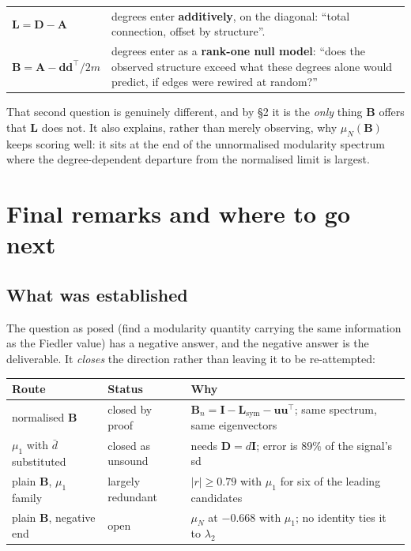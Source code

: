 \documentclass[11pt,a4paper]{article}
\newcommand{\Lap}{\mathbf{L}}
\newcommand{\Amat}{\mathbf{A}}
\newcommand{\Bmat}{\mathbf{B}}
\newcommand{\Dmat}{\mathbf{D}}
\newcommand{\dvec}{\mathbf{d}}
\newcommand{\Lsym}{\Lap_{\mathrm{sym}}}
\newcommand{\Bn}{\Bmat_{n}}
\begin{document}
\begin{center}\small
\renewcommand{\arraystretch}{1.25}
\begin{tabular}{@{}>{\raggedright\arraybackslash}p{4.2cm}
                  >{\raggedright\arraybackslash}p{11.2cm}@{}}
\toprule
$\Lap = \Dmat - \Amat$ &
degrees enter \textbf{additively}, on the diagonal: ``total connection, offset by
structure''. \\
$\Bmat = \Amat - \dvec\dvec^{\!\top}\!/2m$ &
degrees enter as a \textbf{rank-one null model}: ``does the observed structure
exceed what these degrees alone would predict, if edges were rewired at random?''
\\
\bottomrule
\end{tabular}
\end{center}

That second question is genuinely different, and by \S2 it is the \emph{only} thing
$\Bmat$ offers that $\Lap$ does not. It also explains, rather than merely
observing, why $\mu_N(\Bmat)$ keeps scoring well: it sits at the end of the
unnormalised modularity spectrum where the degree-dependent departure from the
normalised limit is largest.

\section{Final remarks and where to go next}

\subsection*{What was established}

The question as posed (find a modularity quantity carrying the same information
as the Fiedler value) has a negative answer, and the negative answer is the
deliverable. It \emph{closes} the direction rather than leaving it to be
re-attempted:

\begin{center}\small
\renewcommand{\arraystretch}{1.2}
\begin{tabular}{@{}lll@{}}
\toprule
\textbf{Route} & \textbf{Status} & \textbf{Why} \\
\midrule
normalised $\Bmat$ & \textcolor{BadRed}{closed by proof} &
$\Bn = \mathbf{I}-\Lsym-\mathbf{u}\mathbf{u}^{\!\top}$; same spectrum, same eigenvectors \\
$\mu_1$ with $\bar d$ substituted & \textcolor{BadRed}{closed as unsound} &
needs $\Dmat=d\mathbf{I}$; error is $89\%$ of the signal's sd \\
plain $\Bmat$, $\mu_1$ family & \textcolor{BadRed}{largely redundant} &
$|r|\ge0.79$ with $\mu_1$ for six of the leading candidates \\
plain $\Bmat$, negative end & \textcolor{LapC}{open} &
$\mu_N$ at $-0.668$ with $\mu_1$; no identity ties it to $\lambda_2$ \\
\bottomrule
\end{tabular}
\end{center}
\end{document}
